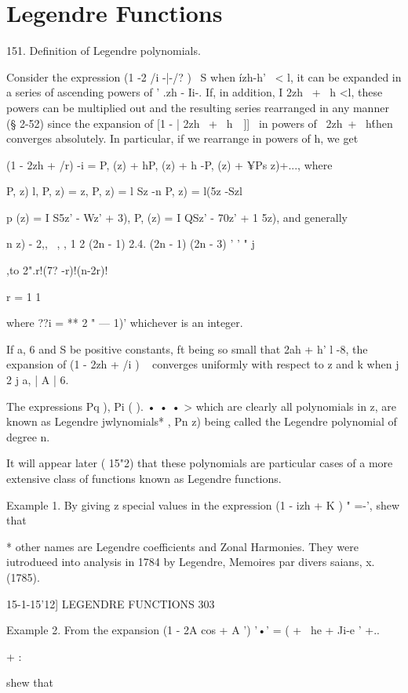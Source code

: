 \chapter{Legendre Functions} 

151. Definition of Legendre polynomials.

Consider the expression (1 -2 /i -|-/? )~ S when \'izh-h' \ < l, it
can be expanded in a series of ascending powers of ' .zh - Ii-. If, in
addition, I 2zh \ + \ h <l, these powers can be multiplied out and the
resulting series rearranged in any manner (§ 2-52) since the expansion
of [1 - | 2zh \ + \ h\ \ ]]~ in powers of \ 2zh\ + \ h\' then
converges absolutely. In particular, if we rearrange in powers of h,
we get

(1 - 2zh + /r) -i = P, (z) + hP, (z) + h -P, (z) + ¥Ps z)+..., where

P, z) l, P, z) = z, P, z) = l Sz -n P, z) = l(5z -Szl

p (z) = I S5z' - Wz' + 3), P, (z) = I QSz' - 70z' + 1 5z), and
generally

 n z) - 2,, \ , , 1 2 (2n - 1) 2.4. (2n - 1) (2n - 3) ' ' " j

,to 2".r!(7? -r)!(n-2r)!

r = 1 1

where ??i = ** 2 " — 1)' whichever is an integer.

If a, 6 and S be positive constants, ft being so small that 2ah + h' l
-8, the expansion of (1 - 2zh + /i ) ~ converges uniformly with
respect to z and k when j 2 j a, | A | 6.

The expressions Pq ), Pi ( ). • • • > which are clearly all
polynomials in z, are known as Legendre jwlynomials* , Pn z) being
called the Legendre polynomial of degree n.

It will appear later ( 15"2) that these polynomials are particular
cases of a more extensive class of functions known as Legendre
functions.

Example 1. By giving z special values in the expression (1 - izh + K )
" =-', shew that

* other names are Legendre coefficients and Zonal Harmonies. They were
iutrodueed into analysis in 1784 by Legendre, Memoires par divers
saians, x. (1785).

15-1-15'12] LEGENDRE FUNCTIONS 303

Example 2. From the expansion (1 - 2A cos + A ') '•' = ( + \ he + Ji-e
' +..\

+ :

shew that

